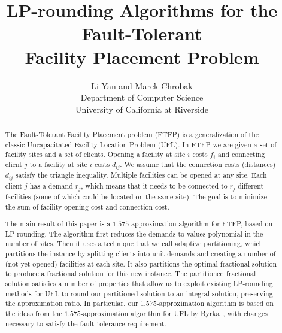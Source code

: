 \documentclass[preprint,12pt]{elsarticle}
\title{LP-rounding Algorithms for the Fault-Tolerant\\
 		Facility Placement Problem}
\author{Li Yan and Marek Chrobak\\
  Department of Computer Science\\
 University of California at Riverside}
\date{}
\begin{document}
\maketitle

\thispagestyle{empty}
\begin{abstract} 
  The Fault-Tolerant Facility Placement problem (FTFP) is a
  generalization of the classic Uncapacitated Facility
  Location Problem (UFL). In FTFP we are given a set of
  facility sites and a set of clients. Opening a facility at
  site $i$ costs $f_i$ and connecting client $j$ to a
  facility at site $i$ costs $d_{ij}$. We assume that the
  connection costs (distances) $d_{ij}$ satisfy the triangle
  inequality. Multiple facilities can be opened at any
  site. Each client $j$ has a demand $r_j$, which means that
  it needs to be connected to $r_j$ different facilities
  (some of which could be located on the same site). The
  goal is to minimize the sum of facility opening cost and
  connection cost.

  The main result of this paper is a $1.575$-approximation algorithm
  for FTFP, based on LP-rounding. The algorithm first reduces the
  demands to values polynomial in the number of sites. Then it uses a
  technique that we call adaptive partitioning, which partitions the
  instance by splitting clients into unit demands and creating a
  number of (not yet opened) facilities at each site. It also
  partitions the optimal fractional solution to produce a fractional
  solution for this new instance.  The partitioned fractional solution
  satisfies a number of properties that allow us to exploit existing
  LP-rounding methods for UFL to round our partitioned solution to an
  integral solution, preserving the approximation ratio.  In
  particular, our $1.575$-approximation algorithm is based on the
  ideas from the $1.575$-approximation algorithm for UFL by
  Byrka~\etal, with changes necessary to satisfy the fault-tolerance
  requirement.
\end{abstract}

\pagebreak
\setcounter{page}{1}




\end{document}
